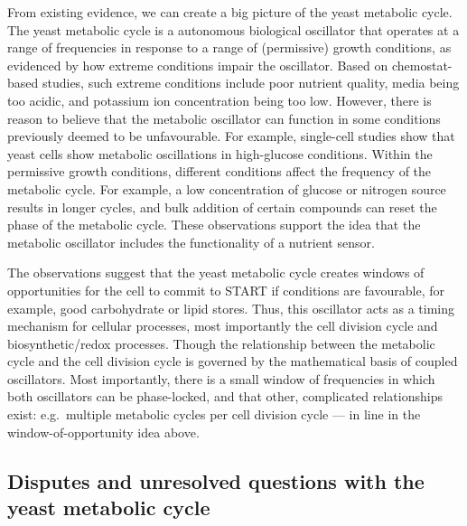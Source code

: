 From existing evidence, we can create a big picture of the yeast metabolic cycle.
The yeast metabolic cycle is a autonomous biological oscillator that operates at a range of frequencies in response to a range of (permissive) growth conditions, as evidenced by how extreme conditions impair the oscillator.
Based on chemostat-based studies, such extreme conditions include poor nutrient quality, media being too acidic, and potassium ion concentration being too low.
However, there is reason to believe that the metabolic oscillator can function in some conditions previously deemed to be unfavourable.
For example, single-cell studies show that yeast cells show metabolic oscillations in high-glucose conditions.
Within the permissive growth conditions, different conditions affect the frequency of the metabolic cycle.
For example, a low concentration of glucose or nitrogen source results in longer cycles, and bulk addition of certain compounds can reset the phase of the metabolic cycle.
These observations support the idea that the metabolic oscillator includes the functionality of a nutrient sensor.

The observations suggest that the yeast metabolic cycle creates windows of opportunities for the cell to commit to START if conditions are favourable, for example, good carbohydrate or lipid stores.
Thus, this oscillator acts as a timing mechanism for cellular processes, most importantly the cell division cycle and biosynthetic/redox processes.
Though the relationship between the metabolic cycle and the cell division cycle is governed by the mathematical basis of coupled oscillators.
Most importantly, there is a small window of frequencies in which both oscillators can be phase-locked, and that other, complicated relationships exist: e.g.\ multiple metabolic cycles per cell division cycle --- in line in the window-of-opportunity idea above.


\subsection{Disputes and unresolved questions with the yeast metabolic cycle}
\label{subsec:intro-ymc-unresolved}

